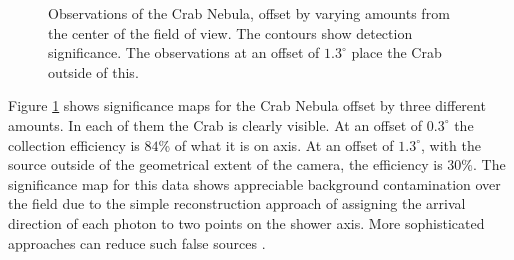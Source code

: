 \begin{figure}[p]
{{}}
\caption{\label{FIG::ANALYSIS::2DSIGMA} Observations of the 
Crab Nebula, offset by varying amounts from the center of the field of 
view. The contours show detection significance. The observations at an 
offset of $1.3^\circ$ place the Crab outside of this.}
\end{figure}

Figure \ref{FIG::ANALYSIS::2DSIGMA} shows significance maps for the
Crab Nebula offset by three different amounts. In each of them the
Crab is clearly visible. At an offset of $0.3^\circ$ the \Gray
collection efficiency is $84$\% of what it is on axis.  At an offset
of $1.3^\circ$, with the source outside of the geometrical extent of
the camera, the efficiency is $30$\%. The significance map for this
data shows appreciable background contamination over the field due to
the simple reconstruction approach of assigning the arrival direction
of each photon to two points on the shower axis. More sophisticated
approaches can reduce such false sources
\citep{REF::LESSARD::2001APP}.

